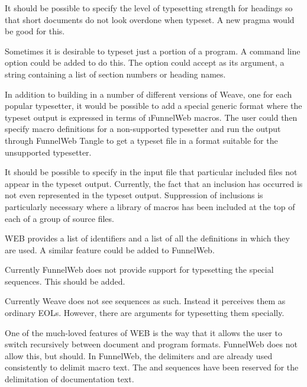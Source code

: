  It should be possible to specify the
level of typesetting strength for headings so that short documents do not
look overdone when typeset. A new pragma would be good for
this.

 Sometimes it is desirable to typeset just a
portion of a program. A command line option could be added to do
this. The option could accept as its argument, a string containing a list
of section numbers or heading names.

 In addition to building in a number
of different versions of Weave, one for each popular typesetter, it would be
possible to add a special generic format where the typeset output is
expressed in terms of \i{FunnelWeb macros}. The user could then specify
macro definitions for a non-supported typesetter and run the output
through FunnelWeb Tangle to get a typeset file in a format suitable for the
unsupported typesetter.

 It should be possible to specify
in the input file that particular included files not appear in the
typeset output. Currently, the fact that an inclusion has occurred is
not even represented in the typeset output. Suppression of inclusions
is particularly necessary where a library of macros has been included
at the top of each of a group of source files.

 WEB provides a list of identifiers
and a list of all the definitions in which they are used. A similar
feature could be added to FunnelWeb.

 Currently FunnelWeb does not provide
support for typesetting the special  sequences.
This should be added.

 Currently Weave does not see 
sequences as such. Instead it perceives them as ordinary EOLs. However,
there are arguments for typesetting them specially.

 One of the much-loved features
of WEB is the way that it allows the user to switch recursively between
document and program formats. FunnelWeb does not allow this, but
should. In FunnelWeb, the delimiters  and  are already
used consistently to delimit macro text. The \dqp{@[} and \dqp{@]} sequences
have been reserved for the delimitation of documentation text.

